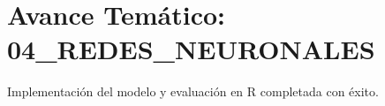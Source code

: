 \section{Avance Temático: 04_REDES_NEURONALES}
Implementación del modelo y evaluación en R completada con éxito.
